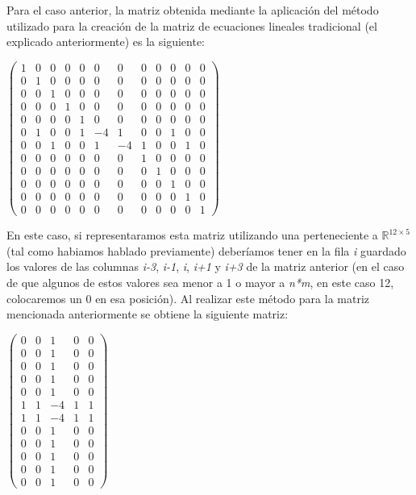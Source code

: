\documentclass[10pt, a4paper]{article}
\begin{document}
Para el caso anterior, la matriz obtenida mediante la aplicaci\'on del m\'etodo utilizado para la creaci\'on de la matriz de ecuaciones lineales tradicional (el explicado anteriormente) es la siguiente:

\begin{center}
$\begin{pmatrix}
1 & 0 & 0 & 0 & 0 &  0 &  0 & 0 & 0 & 0 & 0 & 0 \\
0 & 1 & 0 & 0 & 0 &  0 &  0 & 0 & 0 & 0 & 0 & 0 \\
0 & 0 & 1 & 0 & 0 &  0 &  0 & 0 & 0 & 0 & 0 & 0 \\
0 & 0 & 0 & 1 & 0 &  0 &  0 & 0 & 0 & 0 & 0 & 0 \\
0 & 0 & 0 & 0 & 1 &  0 &  0 & 0 & 0 & 0 & 0 & 0 \\
0 & 1 & 0 & 0 & 1 & -4 &  1 & 0 & 0 & 1 & 0 & 0 \\
0 & 0 & 1 & 0 & 0 &  1 & -4 & 1 & 0 & 0 & 1 & 0 \\
0 & 0 & 0 & 0 & 0 &  0 &  0 & 1 & 0 & 0 & 0 & 0 \\
0 & 0 & 0 & 0 & 0 &  0 &  0 & 0 & 1 & 0 & 0 & 0 \\
0 & 0 & 0 & 0 & 0 &  0 &  0 & 0 & 0 & 1 & 0 & 0 \\
0 & 0 & 0 & 0 & 0 &  0 &  0 & 0 & 0 & 0 & 1 & 0 \\
0 & 0 & 0 & 0 & 0 &  0 &  0 & 0 & 0 & 0 & 0 & 1
\end{pmatrix}$
\end{center}

En este caso, si representaramos esta matriz utilizando una perteneciente a $\mathbb{R}^{12\times 5}$ (tal como habiamos hablado previamente) deber\'iamos tener en la fila \textit{i} guardado los valores de las columnas \textit{i-3}, \textit{i-1}, \textit{i}, \textit{i+1} y \textit{i+3} de la matriz anterior (en el caso de que algunos de estos valores sea menor a 1 o mayor a \textit{n*m}, en este caso 12, colocaremos un 0 en esa posici\'on). Al realizar este m\'etodo para la matriz mencionada anteriormente se obtiene la siguiente matriz:

\begin{center}
$\begin{pmatrix}
0 & 0 & 1 & 0 & 0 \\
0 & 0 & 1 & 0 & 0 \\
0 & 0 & 1 & 0 & 0 \\
0 & 0 & 1 & 0 & 0 \\
0 & 0 & 1 & 0 & 0 \\
1 & 1 & -4 & 1 & 1 \\
1 & 1 & -4 & 1 & 1 \\
0 & 0 & 1 & 0 & 0 \\
0 & 0 & 1 & 0 & 0 \\
0 & 0 & 1 & 0 & 0 \\
0 & 0 & 1 & 0 & 0 \\
0 & 0 & 1 & 0 & 0
\end{pmatrix}$
\end{center}
\end{document}
